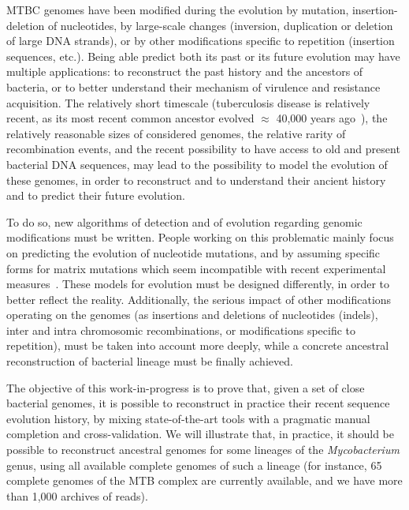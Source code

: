 \documentclass[runningheads,a4paper]{llncs}
\begin{document}
MTBC genomes have been modified during the evolution by mutation, insertion-deletion of nucleotides, by large-scale changes (inversion, duplication or deletion of large DNA strands), or by other modifications specific to repetition (insertion sequences, etc.). 
Being able predict both its past or its future evolution 
may have multiple applications: %
to reconstruct the past history and the ancestors of bacteria, or to better understand their mechanism of virulence and resistance acquisition.
The relatively short timescale (tuberculosis disease is relatively recent, as its most recent common ancestor evolved $\approx$ 40,000 years ago~\cite{wirth2008origin}), the relatively reasonable sizes of considered genomes, the relative rarity of recombination events, and the recent possibility to have access to old and present bacterial DNA sequences, may lead to the possibility to model the evolution of these genomes, in order to reconstruct and to understand their ancient history and to predict their future evolution. 

To do so, new algorithms of detection and of evolution regarding genomic modifications must be written. People working on this problematic mainly focus on predicting the evolution of nucleotide mutations, and by assuming specific forms for matrix mutations which seem incompatible with recent experimental measures~\cite{lang2008estimating}. These models for evolution must be designed differently, in order to better reflect the reality. Additionally, the serious impact of other modifications operating on the genomes (as insertions and deletions of nucleotides (indels), inter and intra chromosomic recombinations, or modifications specific to repetition), must be taken into account more deeply, while a concrete ancestral reconstruction of bacterial lineage must be finally achieved.

The objective of this work-in-progress is to prove that, given a set of close bacterial genomes, it is possible to reconstruct in practice their recent sequence evolution history, by mixing state-of-the-art tools with a pragmatic manual completion and cross-validation. %
We will illustrate that, in practice, it should be possible to reconstruct ancestral genomes for some lineages of the  \textit{Mycobacterium} genus, using all available complete genomes of such a lineage (for instance, 65 complete genomes of the MTB complex are currently available, and we have more than 1,000 archives of reads). 
\end{document}
